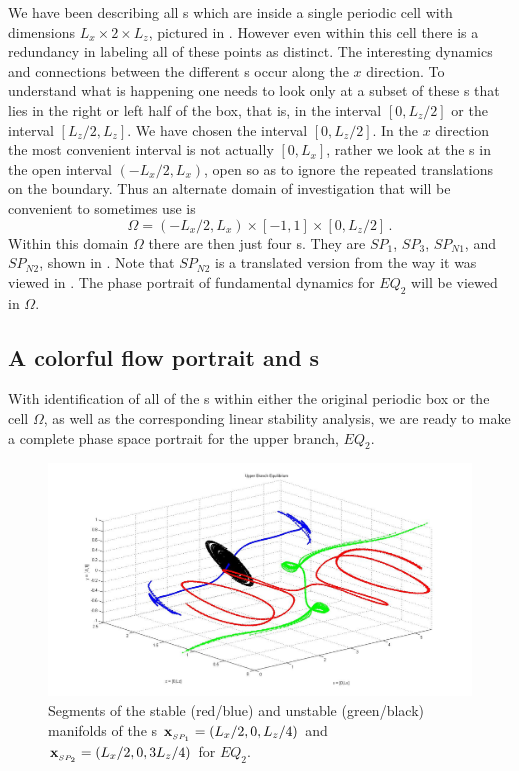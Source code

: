 \documentclass[letter,12pt,openany]{article}
\begin{document}
We have been describing all \stagp s which are inside a single periodic 
cell with dimensions $L_x \times 2 \times L_z$, pictured in 
. However even within this cell there is a 
redundancy in labeling all of these points as distinct. The interesting 
dynamics and connections between the different \stagp s occur along the 
$x$ direction. To understand what is happening one needs to look only at 
a subset of these \stagp s that lies in the right or left half of the 
box, that is, in the interval $[0,L_{z}/2]$ or the interval 
$[L_{z}/2,L_{z}]$. We have chosen the interval $[0,L_{z}/2]$. In the $x$ 
direction the most convenient interval is not actually $[0,L_{x}]$, 
rather we look at the \stagp s in the open interval $(-L_{x}/2,L_{x})$, 
open so as to ignore the repeated translations on the boundary. Thus an 
alternate domain of investigation that will be convenient to sometimes 
use is 
\[ %
\Omega = (-L_{x}/2,L_{x}) \times [-1,1] \times [0,L_{z}/2]
\,. 
\] %
Within this domain $\Omega$ there are then just four \stagp s. They 
are $SP_1$, $SP_3$, $SP_{N1}$, and $SP_{N2}$, shown in 
. Note that $SP_{N2}$ is a translated 
version from the way it was viewed in . The 
phase portrait of fundamental dynamics for $EQ_2$ will be viewed in 
$\Omega$.


\subsection{A colorful flow portrait and {\hc}s}

With identification of all of the {\stagp}s within either the original 
periodic box or the cell $\Omega$, as well as the corresponding linear 
stability analysis, we are ready to make a complete phase space portrait 
for the upper branch, $EQ_2$.

\begin{figure}[!h]
\includegraphics[width=1.0\textwidth]{manifolds_both.jpg}
  \caption{
   Segments of the stable (red/blue) and unstable (green/black) manifolds of the \stagp s
   $\bold{x}_{_{SP_{1}}} = (L_x/2,0,L_z/4)$ and
   $\bold{x}_{_{SP_{2}}} = (L_x/2,0,3L_z/4)$ for $EQ_2$. 
   }
  \label{fig:manifolds_both}
 \end{figure}
\end{document}

